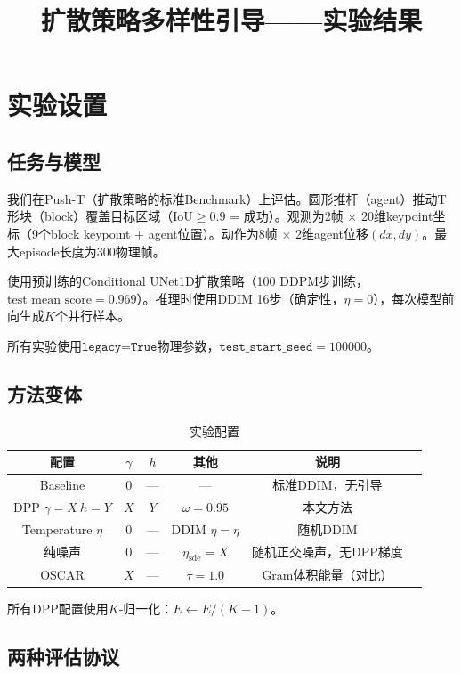 \documentclass[11pt]{article}
\title{扩散策略多样性引导——实验结果}
\author{}
\date{}
\begin{document}
\maketitle

\section{实验设置}

\subsection{任务与模型}

我们在Push-T（扩散策略的标准Benchmark）上评估。圆形推杆（agent）推动T形块（block）覆盖目标区域（$\text{IoU} \geq 0.9$ = 成功）。观测为2帧 $\times$ 20维keypoint坐标（9个block keypoint + agent位置）。动作为8帧 $\times$ 2维agent位移$(dx, dy)$。最大episode长度为300物理帧。

使用预训练的Conditional UNet1D扩散策略（100 DDPM步训练，$\text{test\_mean\_score}=0.969$）。推理时使用DDIM 16步（确定性，$\eta=0$），每次模型前向生成$K$个并行样本。

所有实验使用$\texttt{legacy=True}$物理参数，$\texttt{test\_start\_seed}=100000$。

\subsection{方法变体}

\begin{table}[h]
\centering
\caption{实验配置}
\begin{tabular}{cccccl}
\toprule
配置 & $\gamma$ & $h$ & 其他 & 说明 \\
\midrule
Baseline & 0 & --- & --- & 标准DDIM，无引导 \\
DPP $\gamma{=}X\ h{=}Y$ & $X$ & $Y$ & $\omega{=}0.95$ & 本文方法 \\
Temperature $\eta$ & 0 & --- & DDIM $\eta{=}\eta$ & 随机DDIM \\
纯噪声 & 0 & --- & $\eta_{\text{sde}}{=}X$ & 随机正交噪声，无DPP梯度 \\
OSCAR & $X$ & --- & $\tau{=}1.0$ & Gram体积能量（对比） \\
\bottomrule
\end{tabular}
\end{table}

所有DPP配置使用$K$-归一化：$E \leftarrow E/(K-1)$。

\subsection{两种评估协议}
\end{document}
